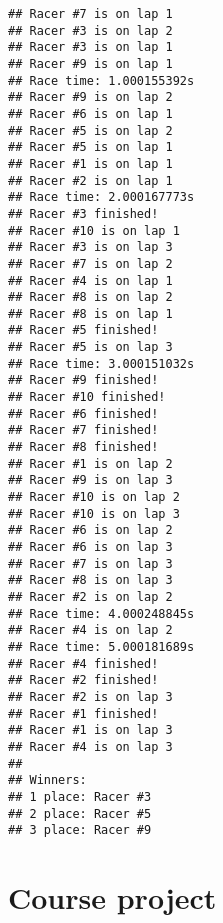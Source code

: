 \documentclass[]{book}
\begin{document}
\begin{verbatim}
## Racer #7 is on lap 1
## Racer #3 is on lap 2
## Racer #3 is on lap 1
## Racer #9 is on lap 1
## Race time: 1.000155392s
## Racer #9 is on lap 2
## Racer #6 is on lap 1
## Racer #5 is on lap 2
## Racer #5 is on lap 1
## Racer #1 is on lap 1
## Racer #2 is on lap 1
## Race time: 2.000167773s
## Racer #3 finished!
## Racer #10 is on lap 1
## Racer #3 is on lap 3
## Racer #7 is on lap 2
## Racer #4 is on lap 1
## Racer #8 is on lap 2
## Racer #8 is on lap 1
## Racer #5 finished!
## Racer #5 is on lap 3
## Race time: 3.000151032s
## Racer #9 finished!
## Racer #10 finished!
## Racer #6 finished!
## Racer #7 finished!
## Racer #8 finished!
## Racer #1 is on lap 2
## Racer #9 is on lap 3
## Racer #10 is on lap 2
## Racer #10 is on lap 3
## Racer #6 is on lap 2
## Racer #6 is on lap 3
## Racer #7 is on lap 3
## Racer #8 is on lap 3
## Racer #2 is on lap 2
## Race time: 4.000248845s
## Racer #4 is on lap 2
## Race time: 5.000181689s
## Racer #4 finished!
## Racer #2 finished!
## Racer #2 is on lap 3
## Racer #1 finished!
## Racer #1 is on lap 3
## Racer #4 is on lap 3
## 
## Winners:
## 1 place: Racer #3
## 2 place: Racer #5
## 3 place: Racer #9
\end{verbatim}

\hypertarget{course-project}{%
\chapter*{Course project}\label{course-project}}
\end{document}
